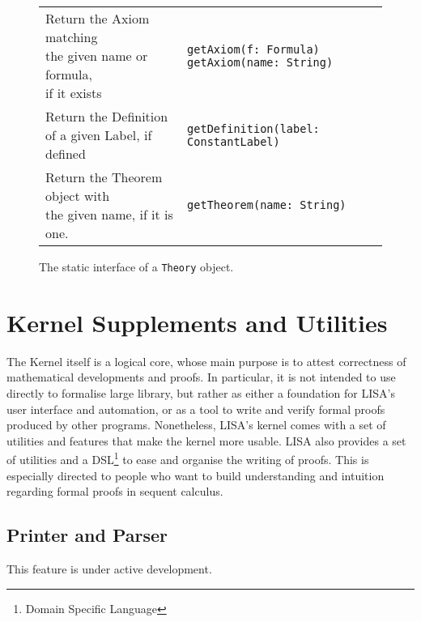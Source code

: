 {\begin{figure}
\begin{center}
\begin{tabular}{l|l}
\makecell[l]{Return the Axiom matching\\ the given name or formula,\\ if it exists} &
\begin{lstlisting}
getAxiom(f: Formula)
getAxiom(name: String)
\end{lstlisting}
\\ %
\makecell[l]{Return the Definition\\of a given Label, if defined} &
\begin{lstlisting}
getDefinition(label: ConstantLabel)
\end{lstlisting}
\\ %

\makecell[l]{Return the Theorem object with\\the given name, if it is one.} &
\begin{lstlisting}
getTheorem(name: String)
\end{lstlisting}
\\ %

\end{tabular}
\caption{The static interface of a \lstinline{Theory}{} object. \label{fig:theorygetters}}
\end{center}
\end{figure}
}
\newpage
\section{Kernel Supplements and Utilities}
\label{sect:kernelsuppl}
The Kernel itself is a logical core, whose main purpose is to attest correctness of mathematical developments and proofs. In particular, it is not intended to use directly to formalise large library, but rather as either a foundation for LISA's user interface and automation, or as a tool to write and verify formal proofs produced by other programs.
Nonetheless, LISA's kernel comes with a set of utilities and features that make the kernel more usable.
LISA also provides a set of utilities and a DSL\footnote{Domain Specific Language} to ease and organise the writing of proofs. This is especially directed to people who want to build understanding and intuition regarding formal proofs in sequent calculus.

\subsection{Printer and Parser}
This feature is under active development.

